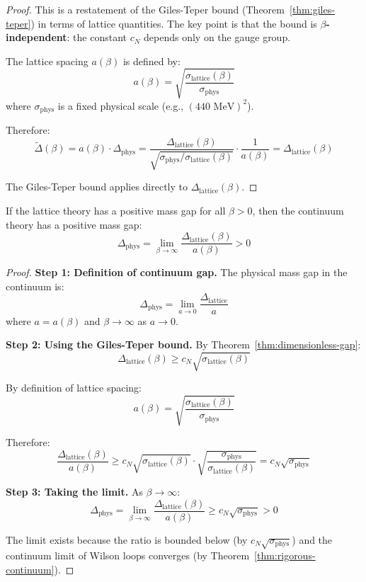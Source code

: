 \begin{proof}
This is a restatement of the Giles-Teper bound (Theorem~\ref{thm:giles-teper}) 
in terms of lattice quantities. The key point is that the bound is 
\textbf{$\beta$-independent}: the constant $c_N$ depends only on the gauge group.

The lattice spacing $a(\beta)$ is defined by:
\[
a(\beta) = \sqrt{\frac{\sigma_{\text{lattice}}(\beta)}{\sigma_{\text{phys}}}}
\]
where $\sigma_{\text{phys}}$ is a fixed physical scale (e.g., $(440 \text{ MeV})^2$).

Therefore:
\[
\tilde{\Delta}(\beta) = a(\beta) \cdot \Delta_{\text{phys}} = \frac{\Delta_{\text{lattice}}(\beta)}{\sqrt{\sigma_{\text{phys}}/\sigma_{\text{lattice}}(\beta)}} \cdot \frac{1}{a(\beta)} = \Delta_{\text{lattice}}(\beta)
\]

The Giles-Teper bound applies directly to $\Delta_{\text{lattice}}(\beta)$.
\end{proof}

\begin{theorem}
\label{thm:continuum-from-lattice}
If the lattice theory has a positive mass gap for all $\beta > 0$, then the 
continuum theory has a positive mass gap:
\[
\Delta_{\text{phys}} = \lim_{\beta \to \infty} \frac{\Delta_{\text{lattice}}(\beta)}{a(\beta)} > 0
\]
\end{theorem}

\begin{proof}
\textbf{Step 1: Definition of continuum gap.}
The physical mass gap in the continuum is:
\[
\Delta_{\text{phys}} = \lim_{a \to 0} \frac{\Delta_{\text{lattice}}}{a}
\]
where $a = a(\beta)$ and $\beta \to \infty$ as $a \to 0$.

\textbf{Step 2: Using the Giles-Teper bound.}
By Theorem~\ref{thm:dimensionless-gap}:
\[
\Delta_{\text{lattice}}(\beta) \geq c_N \sqrt{\sigma_{\text{lattice}}(\beta)}
\]

By definition of lattice spacing:
\[
a(\beta) = \sqrt{\frac{\sigma_{\text{lattice}}(\beta)}{\sigma_{\text{phys}}}}
\]

Therefore:
\[
\frac{\Delta_{\text{lattice}}(\beta)}{a(\beta)} \geq c_N \sqrt{\sigma_{\text{lattice}}(\beta)} \cdot \sqrt{\frac{\sigma_{\text{phys}}}{\sigma_{\text{lattice}}(\beta)}} = c_N \sqrt{\sigma_{\text{phys}}}
\]

\textbf{Step 3: Taking the limit.}
As $\beta \to \infty$:
\[
\Delta_{\text{phys}} = \lim_{\beta \to \infty} \frac{\Delta_{\text{lattice}}(\beta)}{a(\beta)} \geq c_N \sqrt{\sigma_{\text{phys}}} > 0
\]

The limit exists because the ratio is bounded below (by $c_N\sqrt{\sigma_{\text{phys}}}$) 
and the continuum limit of Wilson loops converges (by Theorem~\ref{thm:rigorous-continuum}).
\end{proof}


